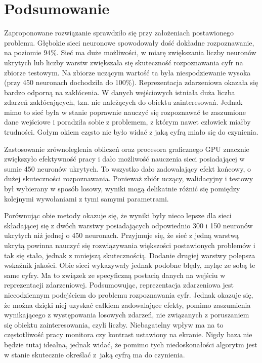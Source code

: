\section{Podsumowanie}
\label{sub:podsumowanie}

Zaproponowane rozwiązanie sprawdziło się przy założeniach postawionego problemu. Głębokie sieci neuronowe spowodowały dość dokładne rozpoznawanie, na poziomie 94\%. Sieć ma duże możliwości, w miarę zwiększania liczby neuronów ukrytych lub liczby warstw zwiększała się skuteczność rozpoznawania cyfr na zbiorze testowym. Na zbiorze uczącym wartość ta była niespodziewanie wysoka (przy 450 neuronach dochodziła do 100\%).
Reprezentacja zdarzeniowa okazała się bardzo odporną na zakłócenia. W danych wejściowych istniała duża liczba zdarzeń zakłócających, tzn. nie należących do obiektu zainteresowań. Jednak mimo to sieć była w stanie poprawnie nauczyć się rozpoznawać te zaszumione dane wejściowe i poradziła sobie z problemem, z którym nawet człowiek miałby trudności. Gołym okiem często nie było widać z jaką cyfrą miało się do czynienia.


\noindent Zastosowanie zrównoleglenia obliczeń oraz procesora graficznego GPU znacznie zwiększyło efektywność pracy i dało możliwość nauczenia sieci posiadającej w sumie 450 neuronów ukrytych. To wszystko dało zadowalający efekt końcowy, o dużej skuteczności rozpoznawania. Ponieważ zbiór uczący, walidacyjny i testowy był wybierany w sposób losowy, wyniki mogą delikatnie różnić się pomiędzy kolejnymi wywołaniami z tymi samymi parametrami.


\noindent Porównując obie metody okazuje się, że wyniki były nieco lepsze dla sieci składającej się z dwóch warstwy posiadających odpowiednio 300 i 150 neuronów ukrytych niż jednej o 450 neuronach. Przyjmuje się, że sieć z jedną warstwą ukrytą powinna nauczyć się rozwiązywania większości postawionych problemów i tak się stało, jednak z mniejszą skutecznością. Dodanie drugiej warstwy polepsza wskaźnik jakości. Obie sieci wykazywały jednak podobne błędy, myląc ze sobą te same cyfry. Ma to związek ze specyficzną postacią danych na wejściu w reprezentacji zdarzeniowej.
Podsumowując, reprezentacja zdarzeniowa jest niecodziennym podejściem do problemu rozpoznawania cyfr. Jednak okazuje się, że można dzięki niej uzyskać całkiem zadowalające efekty, pomimo zaszumienia wynikającego z występowania losowych zdarzeń, nie związanych z poruszaniem się obiektu zainteresowania, czyli liczby. Niebagatelny wpływ ma na to częstotliwość pracy monitora czy kontrast ustawiony na ekranie. Nigdy baza nie będzie tutaj idealna, jednak widać, że pomimo tych niedoskonałości algorytm jest w stanie skutecznie określać z~jaką cyfrą ma do czynienia.

